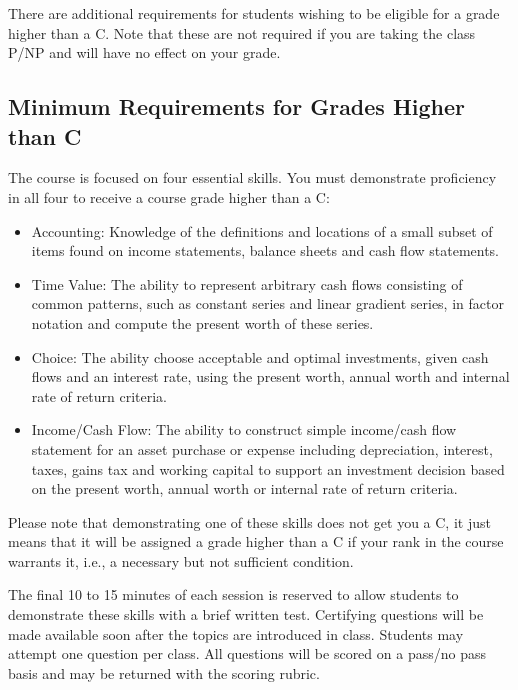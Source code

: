 \documentclass[letterpaper,10pt]{article}
\begin{document}
There are additional requirements for students wishing to be eligible for a grade higher than a C.  Note that these are not required if you are taking the class P/NP and will have no effect on your grade.


\subsection{Minimum Requirements for Grades Higher than C}

The course is focused on four essential skills. You must
demonstrate proficiency in all four to receive a course grade higher than a C:

\begin{itemize}

\item Accounting: Knowledge of the definitions and locations of a
  small subset of items found on income statements, balance sheets and
  cash flow statements.

\item Time Value: The ability to represent arbitrary cash flows
  consisting of common patterns, such as constant series and linear
  gradient series, in factor notation and compute the present worth of
  these series.

\item Choice: The ability choose acceptable and optimal investments,
  given cash flows and an interest rate, using the present worth,
  annual worth and internal rate of return criteria.

\item Income/Cash Flow: The ability to construct simple income/cash
  flow statement for an asset purchase or expense including
  depreciation, interest, taxes, gains tax and working capital to
  support an investment decision based on the present worth, annual
  worth or internal rate of return criteria.
\end{itemize}

Please note that demonstrating one of these skills does not get you a
C, it just means that it will be assigned a grade higher than a C if
your rank in the course warrants it, i.e., a necessary but not sufficient condition.

The final 10 to 15 minutes of each session is reserved to allow
students to demonstrate these skills with a brief written test.
Certifying questions will be made available soon after the topics are introduced in class. Students may attempt one question per class.  All questions
will be scored on a pass/no pass basis and may be returned with the
scoring rubric.  
\end{document}
